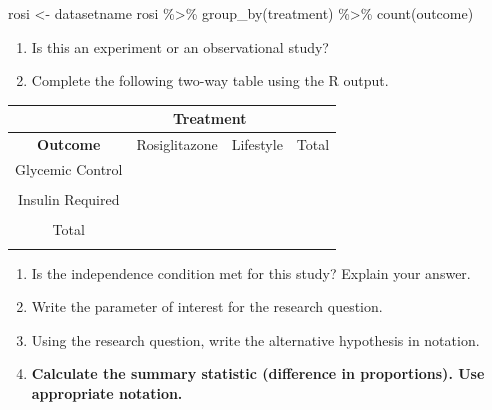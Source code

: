 \documentclass[
]{report}
\newenvironment{Shaded}{\begin{snugshade}}{\end{snugshade}}
\newcommand{\FunctionTok}[1]{\textcolor[rgb]{0.00,0.00,0.00}{#1}}
\newcommand{\NormalTok}[1]{#1}
\newcommand{\OtherTok}[1]{\textcolor[rgb]{0.56,0.35,0.01}{#1}}
\newcommand{\SpecialCharTok}[1]{\textcolor[rgb]{0.00,0.00,0.00}{#1}}
\begin{document}
\begin{Shaded}
\begin{Highlighting}[]
\NormalTok{rosi }\OtherTok{\textless{}{-}}\NormalTok{ datasetname}
\NormalTok{rosi }\SpecialCharTok{\%\textgreater{}\%} \FunctionTok{group\_by}\NormalTok{(treatment) }\SpecialCharTok{\%\textgreater{}\%} \FunctionTok{count}\NormalTok{(outcome)}
\end{Highlighting}
\end{Shaded}

\begin{enumerate}
\def\labelenumi{\arabic{enumi}.}
\item
  Is this an experiment or an observational study?
  \vspace{0.2in}
\item
  Complete the following two-way table using the R output.
\end{enumerate}

\begin{center}
\begin{tabular}{|c|c|c|c|}\hline
 & \multicolumn{2}{|c|}{\textbf{Treatment}} & \\ \hline
\textbf{Outcome} & Rosiglitazone & Lifestyle & Total \\ \hline
 Glycemic Control & & & \\ 
 & & & \\ \hline
 Insulin Required & & & \\ 
 & & & \\ \hline
 Total & & &  \\ 
 & & & \\ \hline  
\end{tabular}
\end{center}

\begin{enumerate}
\def\labelenumi{\arabic{enumi}.}
\setcounter{enumi}{2}
\item
  Is the independence condition met for this study? Explain your answer.
  \vspace{0.6in}
\item
  Write the parameter of interest for the research question.
  \vspace{0.6in}
\item
  Using the research question, write the alternative hypothesis in notation.
  \vspace{0.3in}
\item
  \textbf{Calculate the summary statistic (difference in proportions). Use appropriate notation.}
  \vspace{0.3in}
\end{enumerate}
\end{document}
